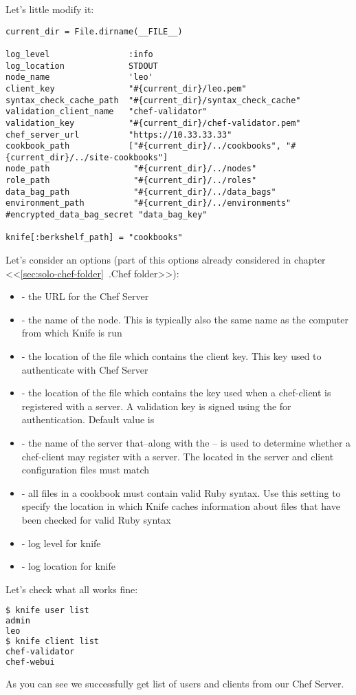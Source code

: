 Let's little modify it:

\begin{lstlisting}[label=lst:my-server-cloud-knife4,title=my-server-cloud/.chef/knife.rb]
current_dir = File.dirname(__FILE__)

log_level                :info
log_location             STDOUT
node_name                'leo'
client_key               "#{current_dir}/leo.pem"
syntax_check_cache_path  "#{current_dir}/syntax_check_cache"
validation_client_name   "chef-validator"
validation_key           "#{current_dir}/chef-validator.pem"
chef_server_url          "https://10.33.33.33"
cookbook_path            ["#{current_dir}/../cookbooks", "#{current_dir}/../site-cookbooks"]
node_path                 "#{current_dir}/../nodes"
role_path                 "#{current_dir}/../roles"
data_bag_path             "#{current_dir}/../data_bags"
environment_path          "#{current_dir}/../environments"
#encrypted_data_bag_secret "data_bag_key"

knife[:berkshelf_path] = "cookbooks"
\end{lstlisting}

Let's consider an options (part of this options already considered in chapter <<\ref{sec:solo-chef-folder}~.Chef folder>>):

\begin{itemize}
  \item {} - the URL for the Chef Server
  \item {} - the name of the node. This is typically also the same name as the computer from which Knife is run
  \item {} - the location of the file which contains the client key. This key used to authenticate with Chef Server
  \item {} - the location of the file which contains the key used when a chef-client is registered with a server. A validation key is signed using the  for authentication. Default value is 
  \item {} - the name of the server that–along with the  – is used to determine whether a chef-client may register with a server. The  located in the server and client configuration files must match
  \item {} - all files in a cookbook must contain valid Ruby syntax. Use this setting to specify the location in which Knife caches information about files that have been checked for valid Ruby syntax
  \item {} - log level for knife
  \item {} - log location for knife
\end{itemize}

Let's check what all works fine:

\begin{lstlisting}[language=Bash,label=lst:my-server-cloud-knife5]
$ knife user list
admin
leo
$ knife client list
chef-validator
chef-webui
\end{lstlisting}

As you can see we successfully get list of users and clients from our Chef Server.
